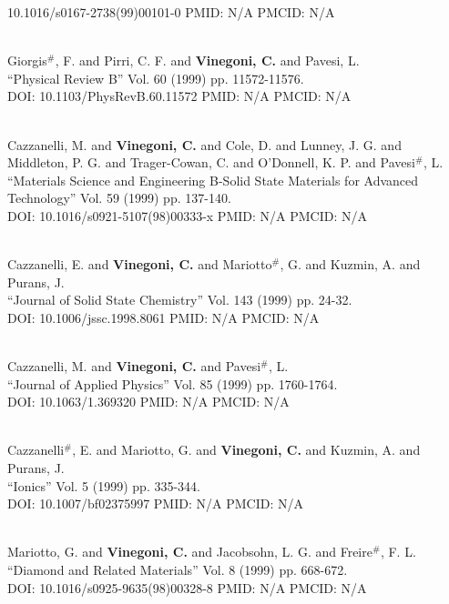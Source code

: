 10.1016/s0167-2738(99)00101-0 PMID: N/A PMCID: N/A\item {} \\ Giorgis$^\#$, F. and Pirri, C. F. and {\bf Vinegoni, C.} and Pavesi, L. \\ ``Physical Review B'' Vol. 60 (1999) pp. 11572-11576. \\ DOI: 10.1103/PhysRevB.60.11572 PMID: N/A PMCID: N/A\item {} \\ Cazzanelli, M. and {\bf Vinegoni, C.} and Cole, D. and Lunney, J. G. and Middleton, P. G. and Trager-Cowan, C. and O'Donnell, K. P. and Pavesi$^\#$, L. \\ ``Materials Science and Engineering B-Solid State Materials for Advanced Technology'' Vol. 59 (1999) pp. 137-140. \\ DOI: 10.1016/s0921-5107(98)00333-x PMID: N/A PMCID: N/A\item {} \\ Cazzanelli, E. and {\bf Vinegoni, C.} and Mariotto$^\#$, G. and Kuzmin, A. and Purans, J. \\ ``Journal of Solid State Chemistry'' Vol. 143 (1999) pp. 24-32. \\ DOI: 10.1006/jssc.1998.8061 PMID: N/A PMCID: N/A\item {} \\ Cazzanelli, M. and {\bf Vinegoni, C.} and Pavesi$^\#$, L. \\ ``Journal of Applied Physics'' Vol. 85 (1999) pp. 1760-1764. \\ DOI: 10.1063/1.369320 PMID: N/A PMCID: N/A\item {} \\ Cazzanelli$^\#$, E. and Mariotto, G. and {\bf Vinegoni, C.} and Kuzmin, A. and Purans, J. \\ ``Ionics'' Vol. 5 (1999) pp. 335-344. \\ DOI: 10.1007/bf02375997 PMID: N/A PMCID: N/A\item {} \\ Mariotto, G. and {\bf Vinegoni, C.} and Jacobsohn, L. G. and Freire$^\#$, F. L. \\ ``Diamond and Related Materials'' Vol. 8 (1999) pp. 668-672. \\ DOI: 10.1016/s0925-9635(98)00328-8 PMID: N/A PMCID: N/A\item 